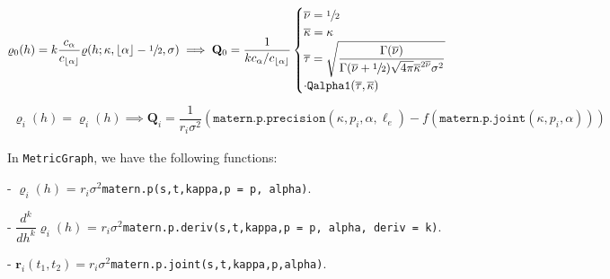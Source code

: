 \documentclass[11pt,a4paper]{article}
\theoremstyle{plain}
\theoremstyle{definition}
\begin{document}
\begin{align}
   \varrho_0(h)= k\dfrac{c_\alpha}{c_{\lfloor\alpha\rfloor}}\varrho(h;\kappa, \lfloor\alpha\rfloor-\sfrac{1}{2}, \sigma)\implies\mathbf{Q}_0 = \dfrac{1}{kc_\alpha/c_{\lfloor\alpha\rfloor}} \begin{cases}
        \overline{\nu} = \sfrac{1}{2}\\
        \overline{\kappa} = \kappa\\
        \overline{\tau} =  \sqrt{\dfrac{\Gamma(\overline{\nu})}{\Gamma(\overline{\nu}+\sfrac{1}{2})\sqrt{4\pi}\overline{\kappa}^{2\overline{\nu}}\sigma^2}}\\
        \cdot\texttt{Qalpha1}(\overline{\tau}, \overline{\kappa})
    \end{cases}
\end{align}
\begin{align}
    \varrho_i(h) =  \varrho_i(h) \implies \mathbf{Q}_i= \dfrac{1}{r_i\sigma^2}\left(\texttt{matern.p.precision}(\kappa,p_i,\alpha, \ell_e) - f(\texttt{matern.p.joint}(\kappa,p_i,\alpha))\right)
\end{align}

In \texttt{MetricGraph}, we have the following functions:

 - $\varrho_i(h)$ = $r_i\sigma^2$\texttt{matern.p(s,t,kappa,p = p, alpha)}.
 
  - $\dfrac{d^k}{dh^k}\varrho_i(h)$ = $r_i\sigma^2$\texttt{matern.p.deriv(s,t,kappa,p = p, alpha, deriv = k)}.
 
 
 - $\mathbf{r}_i\left(t_1, t_2\right)=r_i\sigma^2$\texttt{matern.p.joint(s,t,kappa,p,alpha)}.



 
\end{document}
